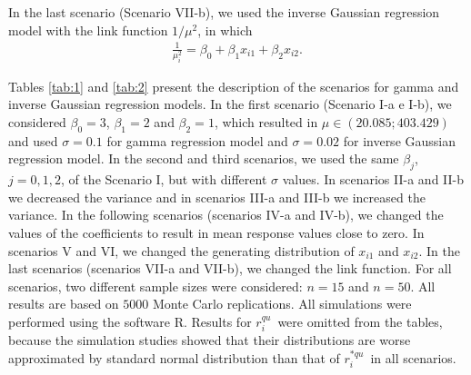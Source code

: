 \documentclass[11pt,authoryear,review,3p,times]{elsarticle}
\newcommand{\qu}{$r_i^{qu}$}
\newcommand{\aqu}{$r_i^{*qu}$}
\begin{document}
In the last scenario (Scenario VII-b), we used the inverse Gaussian regression model with the link function $1/\mu^2$, in which
\begin{eqnarray*}
	\frac{1}{\mu_i^2} = \beta_{0}+\beta_{1}x_{i1}+\beta_{2}x_{i2}.
\end{eqnarray*}

Tables \ref{tab:1} and \ref{tab:2} present the description of the scenarios for gamma and inverse Gaussian regression models.
In the first scenario (Scenario I-a e I-b), we considered $\beta_{0}=3$, $\beta_1=2$ and $\beta_2=1$,  which resulted in $\mu \in (20{.}085 ; 403{.}429)$ and used $\sigma=0{.}1$ for gamma regression model and $\sigma=0{.}02$ for inverse Gaussian regression model.
In the second and third scenarios, we used the same $\beta_j$, $j=0,1,2$, of the Scenario I, but with different $\sigma$ values. In scenarios II-a and II-b we decreased the variance and in scenarios III-a and III-b we increased the variance. 
In the following scenarios (scenarios IV-a and IV-b), we changed the values of the coefficients to result in mean response values close to zero.
In scenarios V and VI, we changed the generating distribution of $x_{i1}$ and $x_{i2}$.
In the last scenarios (scenarios VII-a and VII-b), we changed the link function.
For all scenarios, two different sample sizes were considered: $n=15$ and $n=50$. 
All results are based on $5000$ Monte Carlo replications. 
All simulations were performed using the software R.
Results for \qu\, were omitted from the tables, because the simulation studies showed that their distributions are worse approximated by standard normal distribution than that of \aqu\, in all scenarios. 
\end{document}
